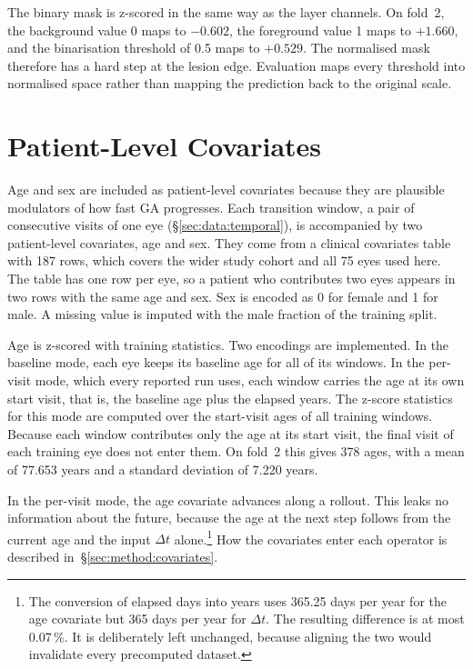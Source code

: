 The binary mask is z-scored in the same way as the layer channels. On
fold~2, the background value 0 maps to $-0.602$, the foreground value 1
maps to $+1.660$, and the binarisation threshold of 0.5 maps to $+0.529$.
The normalised mask therefore has a hard step at the lesion edge.
Evaluation maps every threshold into normalised space rather than mapping
the prediction back to the original scale.


\section{Patient-Level Covariates}
\label{sec:data:covariates}

Age and sex are included as patient-level covariates because they are
plausible modulators of how fast GA progresses.
Each transition window, a pair of consecutive visits of one eye
(\S\ref{sec:data:temporal}), is accompanied by two patient-level
covariates, age and sex.
They come from a clinical covariates table with 187 rows, which covers
the wider study cohort and all 75 eyes used here. The table has one row per
eye, so a patient who contributes two eyes appears in two rows with the
same age and sex. Sex is encoded as 0 for female and 1 for male. A
missing value is imputed with the male fraction of the training split.

Age is z-scored with training statistics. Two encodings are implemented.
In the baseline mode, each eye keeps its baseline age for all of its
windows. In the per-visit mode, which every reported run uses, each
window carries the age at its own start visit, that is, the baseline age
plus the elapsed years. The z-score statistics for this mode are
computed over the start-visit ages of all training windows. Because each
window contributes only the age at its start visit, the final visit of
each training eye does not enter them. On fold~2 this gives 378 ages, with a mean of 77.653
years and a standard deviation of 7.220 years.

In the per-visit mode, the age covariate advances along a rollout. This
leaks no information about the future, because the age at the next step
follows from the current age and the input $\Delta t$
alone.\footnote{The conversion of elapsed days into years uses 365.25
days per year for the age covariate but 365 days per year for $\Delta
t$. The resulting difference is at most 0.07\,\%. It is deliberately
left unchanged, because aligning the two would invalidate every
precomputed dataset.} How the covariates enter each operator is described
in~\S\ref{sec:method:covariates}.

